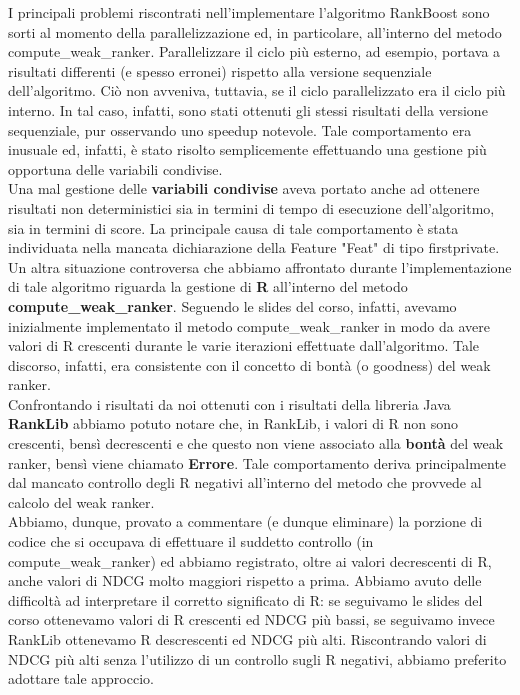 I principali problemi riscontrati nell'implementare l'algoritmo RankBoost sono sorti al momento della parallelizzazione ed, in particolare, all'interno del metodo compute\_weak\_ranker. Parallelizzare il ciclo più esterno, ad esempio, portava a risultati differenti (e spesso erronei) rispetto alla versione sequenziale dell'algoritmo. Ciò non avveniva, tuttavia, se il ciclo parallelizzato era il ciclo più interno. In tal caso, infatti, sono stati ottenuti gli stessi risultati della versione sequenziale, pur osservando uno speedup notevole. Tale comportamento era inusuale ed, infatti, è stato risolto semplicemente effettuando una gestione più opportuna delle variabili condivise.\\
Una mal gestione delle \textbf{variabili condivise} aveva portato anche ad ottenere risultati non deterministici sia in termini di tempo di esecuzione dell'algoritmo, sia in termini di score. La principale causa di tale comportamento è stata individuata nella mancata dichiarazione della Feature "Feat" di tipo firstprivate.\\
Un altra situazione controversa che abbiamo affrontato durante l'implementazione di tale algoritmo riguarda la gestione di \textbf{R} all'interno del metodo \textbf{compute\_weak\_ranker}. Seguendo le slides del corso, infatti, avevamo inizialmente implementato il metodo compute\_weak\_ranker in modo da avere valori di R crescenti durante le varie iterazioni effettuate dall'algoritmo. Tale discorso, infatti, era consistente con il concetto di bontà (o goodness) del weak ranker.\\
Confrontando i risultati da noi ottenuti con i risultati della libreria Java \textbf{RankLib} abbiamo potuto notare che, in RankLib, i valori di R non sono crescenti, bensì decrescenti e che questo non viene associato alla \textbf{bontà} del weak ranker, bensì viene chiamato \textbf{Errore}. Tale comportamento deriva principalmente dal mancato controllo degli R negativi all'interno del metodo che provvede al calcolo del weak ranker.\\
Abbiamo, dunque, provato a commentare (e dunque eliminare) la porzione di codice che si occupava di effettuare il suddetto controllo (in compute\_weak\_ranker) ed abbiamo registrato, oltre ai valori decrescenti di R, anche valori di NDCG molto maggiori rispetto a prima. Abbiamo avuto delle difficoltà ad interpretare il corretto significato di R: se seguivamo le slides del corso ottenevamo valori di R crescenti ed NDCG più bassi, se seguivamo invece RankLib ottenevamo R descrescenti ed NDCG più alti. Riscontrando valori di NDCG più alti senza l'utilizzo di un controllo sugli R negativi, abbiamo preferito adottare tale approccio.\\
